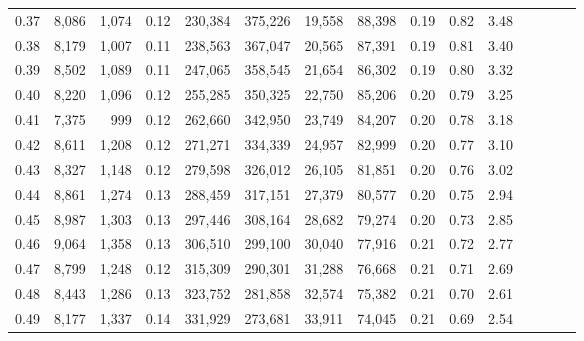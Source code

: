 \begin{tabular}{rrrcrrrrrrrrrrr}
0.37 &   8,086 &  1,074 &                                       0.12 &  230,384 &  375,226 &   19,558 &   88,398 &  0.19 &  0.82 &                         3.48 \\
0.38 &   8,179 &  1,007 &                                       0.11 &  238,563 &  367,047 &   20,565 &   87,391 &  0.19 &  0.81 &                         3.40 \\
0.39 &   8,502 &  1,089 &                                       0.11 &  247,065 &  358,545 &   21,654 &   86,302 &  0.19 &  0.80 &                         3.32 \\
0.40 &   8,220 &  1,096 &                                       0.12 &  255,285 &  350,325 &   22,750 &   85,206 &  0.20 &  0.79 &                         3.25 \\
0.41 &   7,375 &    999 &                                       0.12 &  262,660 &  342,950 &   23,749 &   84,207 &  0.20 &  0.78 &                         3.18 \\
0.42 &   8,611 &  1,208 &                                       0.12 &  271,271 &  334,339 &   24,957 &   82,999 &  0.20 &  0.77 &                         3.10 \\
0.43 &   8,327 &  1,148 &                                       0.12 &  279,598 &  326,012 &   26,105 &   81,851 &  0.20 &  0.76 &                         3.02 \\
0.44 &   8,861 &  1,274 &                                       0.13 &  288,459 &  317,151 &   27,379 &   80,577 &  0.20 &  0.75 &                         2.94 \\
0.45 &   8,987 &  1,303 &                                       0.13 &  297,446 &  308,164 &   28,682 &   79,274 &  0.20 &  0.73 &                         2.85 \\
0.46 &   9,064 &  1,358 &                                       0.13 &  306,510 &  299,100 &   30,040 &   77,916 &  0.21 &  0.72 &                         2.77 \\
0.47 &   8,799 &  1,248 &                                       0.12 &  315,309 &  290,301 &   31,288 &   76,668 &  0.21 &  0.71 &                         2.69 \\
0.48 &   8,443 &  1,286 &                                       0.13 &  323,752 &  281,858 &   32,574 &   75,382 &  0.21 &  0.70 &                         2.61 \\
0.49 &   8,177 &  1,337 &                                       0.14 &  331,929 &  273,681 &   33,911 &   74,045 &  0.21 &  0.69 &                         2.54 \\

\end{tabular}
